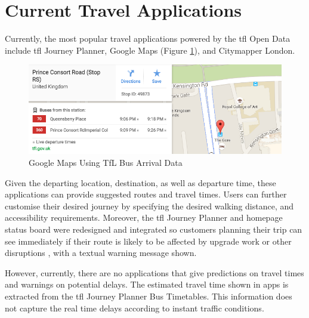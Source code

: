 \section{Current Travel Applications}
\par Currently, the most popular travel applications powered by the \acrshort{tfl} Open Data include \acrshort{tfl} Journey Planner, Google Maps (Figure \ref{fig:google_maps_tfl_data}), and Citymapper London.

\begin{figure}
\centering
\includegraphics[width=1\textwidth]{figures/google_maps_tfl_data.png}
\caption{\label{fig:google_maps_tfl_data} Google Maps Using TfL Bus Arrival Data}
\end{figure}

\par Given the departing location, destination, as well as departure time, these applications can provide suggested routes and travel times. Users can further customise their desired journey by specifying the desired walking distance, and accessibility requirements. Moreover, the \acrshort{tfl} Journey Planner and homepage
status board were redesigned and integrated so customers planning their trip can see immediately if their route is likely to be affected by upgrade work or other disruptions \cite{tfl_annual_report_13/14}, with a textual warning message shown.

\par However, currently, there are no applications that give predictions on travel times and warnings on potential delays. The estimated travel time shown in apps is extracted from the \acrshort{tfl} Journey Planner Bus Timetables. This information does not capture the real time delays according to instant traffic conditions.
